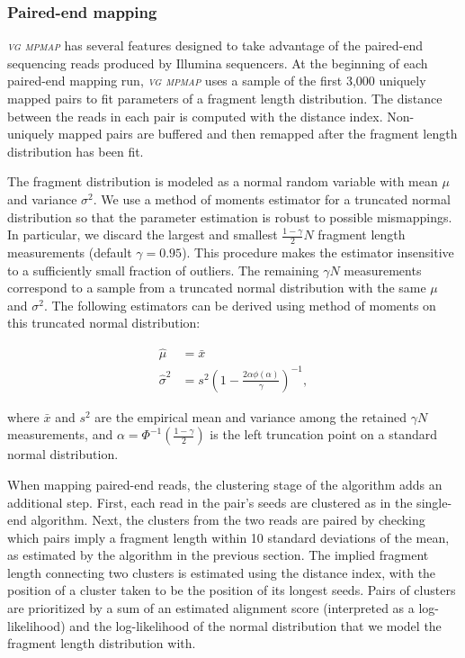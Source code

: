 \documentclass[11pt]{ucthesis}
\newcommand{\tool}[1]{\emph{\textsc{#1}}}
\begin{document}
\subsubsection{Paired-end mapping}

\tool{vg mpmap} has several features designed to take advantage of the paired-end sequencing reads produced by Illumina sequencers. At the beginning of each paired-end mapping run, \tool{vg mpmap} uses a sample of the first 3,000 uniquely mapped pairs to fit parameters of a fragment length distribution. The distance between the reads in each pair is computed with the distance index. Non-uniquely mapped pairs are buffered and then remapped after the fragment length distribution has been fit. 

The fragment distribution is modeled as a normal random variable with mean $\mu$ and variance $\sigma^2$. We use a method of moments estimator for a truncated normal distribution so that the parameter estimation is robust to possible mismappings. In particular, we discard the largest and smallest $\frac{1 - \gamma}{2}N$ fragment length measurements (default ${\gamma = 0.95}$). This procedure makes the estimator insensitive to a sufficiently small fraction of outliers. The remaining $\gamma N$ measurements correspond to a sample from a truncated normal distribution with the same $\mu$ and $\sigma^2$. The following estimators can be derived using method of moments on this truncated normal distribution:

\begin{equation}
\begin{aligned}
    \hat \mu &= \bar x \\
	\hat \sigma^2 &= s^2\left(1 - \frac{2\alpha\phi(\alpha)}{\gamma}\right)^{-1},
\end{aligned}
\end{equation}
	
\noindent where $\bar x$ and $s^2$ are the empirical mean and variance among the retained $\gamma N$ measurements, and ${\alpha = \Phi^{-1}\left(\frac{1 - \gamma}{2}\right)}$ is the left truncation point on a standard normal distribution.

When mapping paired-end reads, the clustering stage of the algorithm adds an additional step. First, each read in the pair's seeds are clustered as in the single-end algorithm. Next, the clusters from the two reads are paired by checking which pairs imply a fragment length within 10 standard deviations of the mean, as estimated by the algorithm in the previous section. The implied fragment length connecting two clusters is estimated using the distance index, with the position of a cluster taken to be the position of its longest seeds. Pairs of clusters are prioritized by a sum of an estimated alignment score (interpreted as a log-likelihood) and the log-likelihood of the normal distribution that we model the fragment length distribution with.
\end{document}
